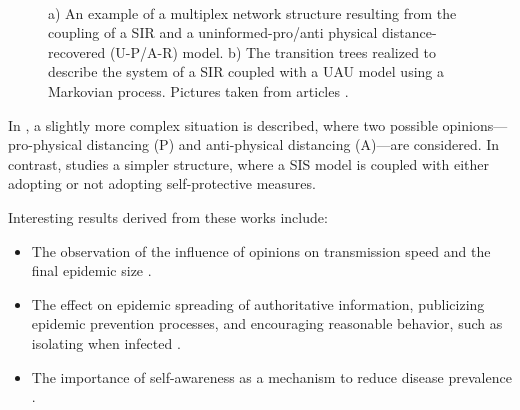 \begin{figure}[h]
	\centering
	 \quad
	 \\
	\caption[Multiplex networks]{a) An example of a multiplex network structure resulting from the coupling of a SIR and a uninformed-pro/anti physical distance-recovered (U-P/A-R) model. b) The transition trees realized to describe the system of a SIR coupled  with a UAU model using a Markovian process. Pictures taken from articles \cite{Peng2021, Silva2019}.}
	\label{fig:sir_example3}
\end{figure}

In \cite{Peng2021}, a slightly more complex situation is described, where two possible opinions—pro-physical distancing (P) and anti-physical distancing (A)—are considered. In contrast, \cite{Frieswijk_2022} studies a simpler structure, where a SIS model is coupled with either adopting or not adopting self-protective measures.

Interesting results derived from these works include: 
\begin{itemize} 
	\item The observation of the influence of opinions on transmission speed and the final epidemic size \cite{Peng2021}. 
	\item The effect on epidemic spreading of authoritative information, publicizing epidemic prevention processes, and encouraging reasonable behavior, such as isolating when infected \cite{Zuo_2021}. 
	\item The importance of self-awareness as a mechanism to reduce disease prevalence \cite{Silva2019}. 
\end{itemize}

